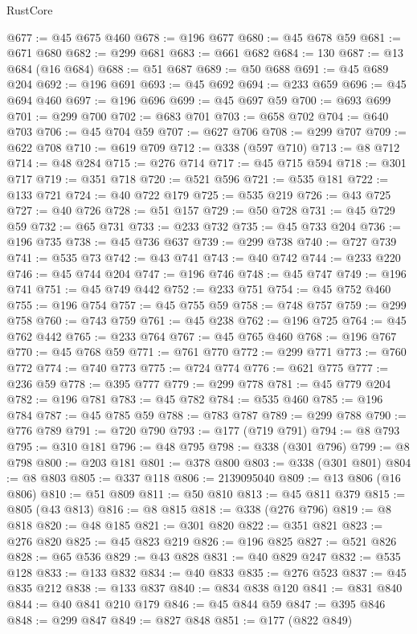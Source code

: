 \begin{lexlean}{RustCore}
\begin{coremodule}
@677 := @45 @675 @460
@678 := @196 @677
@680 := @45 @678 @59
@681 := @671 @680
@682 := @299 @681
@683 := @661 @682
@684 := 130
@687 := @13 @684 (@16 @684)
@688 := @51 @687
@689 := @50 @688
@691 := @45 @689 @204
@692 := @196 @691
@693 := @45 @692
@694 := @233 @659
@696 := @45 @694 @460
@697 := @196 @696
@699 := @45 @697 @59
@700 := @693 @699
@701 := @299 @700
@702 := @683 @701
@703 := @658 @702
@704 := @640 @703
@706 := @45 @704 @59
@707 := @627 @706
@708 := @299 @707
@709 := @622 @708
@710 := @619 @709
@712 := @338 (@597 @710)
@713 := @8 @712
@714 := @48 @284
@715 := @276 @714
@717 := @45 @715 @594
@718 := @301 @717
@719 := @351 @718
@720 := @521 @596
@721 := @535 @181
@722 := @133 @721
@724 := @40 @722 @179
@725 := @535 @219
@726 := @43 @725
@727 := @40 @726
@728 := @51 @157
@729 := @50 @728
@731 := @45 @729 @59
@732 := @65 @731
@733 := @233 @732
@735 := @45 @733 @204
@736 := @196 @735
@738 := @45 @736 @637
@739 := @299 @738
@740 := @727 @739
@741 := @535 @73
@742 := @43 @741
@743 := @40 @742
@744 := @233 @220
@746 := @45 @744 @204
@747 := @196 @746
@748 := @45 @747
@749 := @196 @741
@751 := @45 @749 @442
@752 := @233 @751
@754 := @45 @752 @460
@755 := @196 @754
@757 := @45 @755 @59
@758 := @748 @757
@759 := @299 @758
@760 := @743 @759
@761 := @45 @238
@762 := @196 @725
@764 := @45 @762 @442
@765 := @233 @764
@767 := @45 @765 @460
@768 := @196 @767
@770 := @45 @768 @59
@771 := @761 @770
@772 := @299 @771
@773 := @760 @772
@774 := @740 @773
@775 := @724 @774
@776 := @621 @775
@777 := @236 @59
@778 := @395 @777
@779 := @299 @778
@781 := @45 @779 @204
@782 := @196 @781
@783 := @45 @782
@784 := @535 @460
@785 := @196 @784
@787 := @45 @785 @59
@788 := @783 @787
@789 := @299 @788
@790 := @776 @789
@791 := @720 @790
@793 := @177 (@719 @791)
@794 := @8 @793
@795 := @310 @181
@796 := @48 @795
@798 := @338 (@301 @796)
@799 := @8 @798
@800 := @203 @181
@801 := @378 @800
@803 := @338 (@301 @801)
@804 := @8 @803
@805 := @337 @118
@806 := 2139095040
@809 := @13 @806 (@16 @806)
@810 := @51 @809
@811 := @50 @810
@813 := @45 @811 @379
@815 := @805 (@43 @813)
@816 := @8 @815
@818 := @338 (@276 @796)
@819 := @8 @818
@820 := @48 @185
@821 := @301 @820
@822 := @351 @821
@823 := @276 @820
@825 := @45 @823 @219
@826 := @196 @825
@827 := @521 @826
@828 := @65 @536
@829 := @43 @828
@831 := @40 @829 @247
@832 := @535 @128
@833 := @133 @832
@834 := @40 @833
@835 := @276 @523
@837 := @45 @835 @212
@838 := @133 @837
@840 := @834 @838 @120
@841 := @831 @840
@844 := @40 @841 @210 @179
@846 := @45 @844 @59
@847 := @395 @846
@848 := @299 @847
@849 := @827 @848
@851 := @177 (@822 @849)

\end{coremodule}
\end{lexlean}
